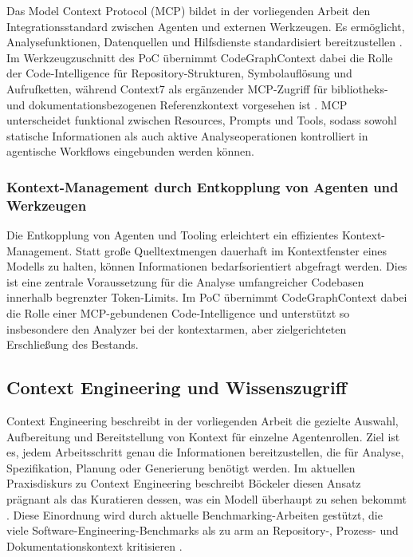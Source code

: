 Das Model Context Protocol (MCP) bildet in der vorliegenden Arbeit den Integrationsstandard zwischen Agenten und externen Werkzeugen. Es ermöglicht, Analysefunktionen, Datenquellen und Hilfsdienste standardisiert bereitzustellen \parencite{mcpdocs}. Im Werkzeugzuschnitt des PoC übernimmt CodeGraphContext dabei die Rolle der Code-Intelligence für Repository-Strukturen, Symbolauflösung und Aufrufketten, während Context7 als ergänzender MCP-Zugriff für bibliotheks- und dokumentationsbezogenen Referenzkontext vorgesehen ist \parencite{codegraphcontext,context7docs}. MCP unterscheidet funktional zwischen Resources, Prompts und Tools, sodass sowohl statische Informationen als auch aktive Analyseoperationen kontrolliert in agentische Workflows eingebunden werden können.

\subsubsection{Kontext-Management durch Entkopplung von Agenten und Werkzeugen}

Die Entkopplung von Agenten und Tooling erleichtert ein effizientes Kontext-Management. Statt große Quelltextmengen dauerhaft im Kontextfenster eines Modells zu halten, können Informationen bedarfsorientiert abgefragt werden. Dies ist eine zentrale Voraussetzung für die Analyse umfangreicher Codebasen innerhalb begrenzter Token-Limits. Im PoC übernimmt CodeGraphContext dabei die Rolle einer MCP-gebundenen Code-Intelligence und unterstützt so insbesondere den Analyzer bei der kontextarmen, aber zielgerichteten Erschließung des Bestands.

\subsection{Context Engineering und Wissenszugriff}

Context Engineering beschreibt in der vorliegenden Arbeit die gezielte Auswahl, Aufbereitung und Bereitstellung von Kontext für einzelne Agentenrollen. Ziel ist es, jedem Arbeitsschritt genau die Informationen bereitzustellen, die für Analyse, Spezifikation, Planung oder Generierung benötigt werden. Im aktuellen Praxisdiskurs zu Context Engineering beschreibt Böckeler diesen Ansatz prägnant als das Kuratieren dessen, was ein Modell überhaupt zu sehen bekommt \parencite{boeckeler2026contextengineering}. Diese Einordnung wird durch aktuelle Benchmarking-Arbeiten gestützt, die viele Software-Engineering-Benchmarks als zu arm an Repository-, Prozess- und Dokumentationskontext kritisieren \parencite{rodriguezcardenas2026behelm}.

